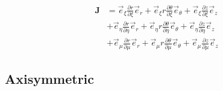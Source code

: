 \documentclass[times,namecite]{goose-article}
\begin{document}
\begin{align}
  \bm{J}
  &=
  \vec{e}_\xi    \frac{\partial r     }{\partial \xi } \vec{e}_r      +
  \vec{e}_\xi  r \frac{\partial \theta}{\partial \xi } \vec{e}_\theta +
  \vec{e}_\xi    \frac{\partial z     }{\partial \xi } \vec{e}_z
  \nonumber
  \\
  &+
  \vec{e}_\eta   \frac{\partial r     }{\partial \eta} \vec{e}_r      +
  \vec{e}_\eta r \frac{\partial \theta}{\partial \eta} \vec{e}_\theta +
  \vec{e}_\eta   \frac{\partial z     }{\partial \eta} \vec{e}_z
  \nonumber
  \\
  &+
  \vec{e}_\mu    \frac{\partial r     }{\partial \mu } \vec{e}_r      +
  \vec{e}_\mu  r \frac{\partial \theta}{\partial \mu } \vec{e}_\theta +
  \vec{e}_\mu    \frac{\partial z     }{\partial \mu } \vec{e}_z
\end{align}

\subsection{Axisymmetric}

% 
\end{document}
